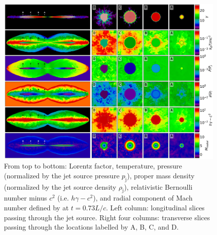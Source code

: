 \begin{figure}
	\includegraphics[width=\linewidth]{srhd-figures/JetAccLowRes.png}
    \caption{
    From top to bottom: Lorentz factor, temperature, pressure (normalized by the jet source pressure $p_{\text{j}}$), proper mass density (normalized by the jet source density $\rho_{\text{j}}$), relativistic Bernoulli number minus $c^2$ (i.e. $h\gamma-c^2$), and radial component of Mach number defined by  at $t=0. 73 L/c$. Left column: longitudinal slices passing through the jet source. Right four columns: transverse slices passing through the locations labelled by A, B, C, and D.}
   \label{fig:Limb_brightened_jet}
\end{figure}



